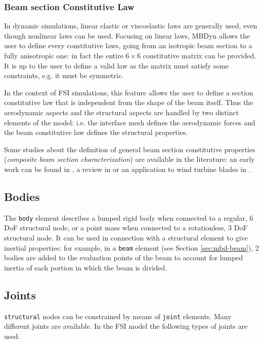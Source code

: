 \subsubsection{Beam section Constitutive Law}

In dynamic simulations, linear elastic or viscoelastic laws are generally used, even though nonlinear laws can be used.  Focusing on linear laws, MBDyn allows the user to define every constitutive laws, going from an isotropic beam section to a fully anisotropic one: in fact the entire $6 \times 6$ constitutive matrix can be provided. It is up to the user to define a valid law as the matrix must satisfy some constraints, e.g. it must be symmetric.

In the context of FSI simulations, this feature allows the user to define a section constitutive law that is independent from the shape of the beam itself. Thus the aerodynamic aspects and the structural aspects are handled by two distinct elements of the model: i.e. the interface mesh defines the aerodynamic forces and the beam constitutive law defines the structural properties.   

Some studies about the definition of general beam section constitutive properties (\textit{composite beam section characterization}) are available in the literature: an early work can be found in \cite{giavotto1983anisotropic}, a review in \cite{hodges1990review} or an application to wind turbine blades in \cite{kim2013development}.


\subsection{Bodies}
\label{sec:mbd-body}

The \texttt{body} element describes a lumped rigid body when connected to a regular, 6 DoF structural node, or a point mass when connected to a rotationless, 3 DoF structural node. It can be used in connection with a structural element to give inertial properties: for example, in a \texttt{beam} element (see Section \ref{sec:mbd-beam}), 2 bodies are added to the evaluation points of the beam to account for lumped inertia of each portion in which the beam is divided. 


\subsection{Joints}
\label{sec:mbd-joint}

\texttt{structural} nodes can be constrained by means of \texttt{joint} elements. Many different joints are available. In the FSI model the following types of joints are used:

